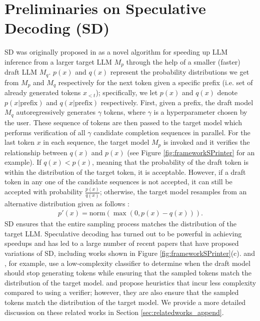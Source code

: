 \documentclass{article}
\theoremstyle{plain}
\theoremstyle{definition}
\theoremstyle{remark}
\begin{document}
\section{Preliminaries on Speculative Decoding (SD)}
\label{sec:prelims}
SD was originally proposed in \cite{leviathan2023fast} as a novel algorithm for speeding up LLM inference from a larger target LLM $M_p$ 
through the help of a smaller (faster) draft LLM $M_q$. $p(x)$ and $q(x)$ represent the probability distributions we get from $M_p$ and $M_q$ respectively for the next token given a specific prefix (i.e. set of already generated tokens $x_{<t}$); specifically, we let $p(x)$ and $q(x)$ denote $p(x|\text{prefix})$ and $q(x|\text{prefix})$ respectively. First, given a prefix, the draft model $M_q$ autoregressively generates $\gamma$ tokens, where $\gamma$ is a hyperparameter chosen by the user. These sequence of tokens are then passed to the target model which performs verification of all $\gamma$ candidate completion sequences in parallel. For the last token $x$ in each sequence, the target model $M_p$ is invoked and it verifies the relationship between $q(x)$ and $p(x)$ (see Figure \ref{fig:frameworkSPrinter} for an example). If $q(x) < p(x)$, meaning that the probability of the draft token is within the distribution of the target token, it is acceptable. However, if a draft token in any one of the candidate sequences is not accepted, it can still be accepted with probability $\frac{p(x)}{q(x)}$; otherwise, the target model resamples from an alternative distribution given as follows \cite{leviathan2023fast}: 
\begin{align}
  p'(x) = \text{norm}(\max(0, p(x) - q(x))).
    \label{eq:resample}
\end{align}
SD ensures that the entire sampling process matches the distribution of the target LLM. Speculative decoding has turned out to be powerful in achieving speedups and has led to a large number of recent papers that have proposed variations of SD, including works shown in Figure \ref{fig:frameworkSPrinter}(c). \cite{mamou2024dynamicspeculationlookaheadaccelerates} and \cite{huang2024specdec++}, for example, use a low-complexity classifier to determine when the draft model should stop generating tokens while ensuring that the sampled tokens match the distribution of the target model. \cite{kim2024speculative} and \cite{agrawal2024adaedl} propose heuristics that incur less complexity compared to using a verifier; however, they are also ensure that the sampled tokens match the distribution of the target model. We provide a more detailed discussion on these related works in Section \ref{sec:relatedworks_append}. 
\end{document}
